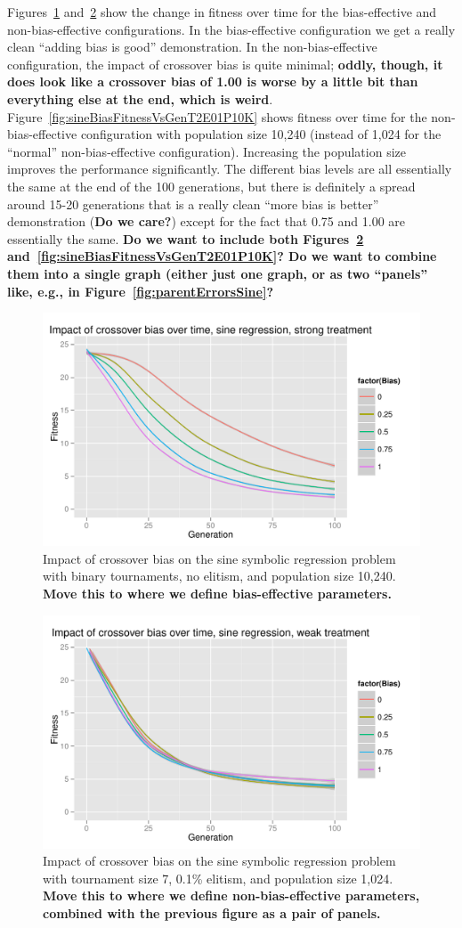 \documentclass{sig-alternate}
\begin{document}
Figures~\ref{fig:sineBiasFitnessVsGenStrong} and~\ref{fig:sineBiasFitnessVsGenWeak} show the change in fitness over
time for the bias-effective and non-bias-effective configurations. In the bias-effective configuration we get a really
clean ``adding bias is good'' demonstration. In the non-bias-effective configuration, the impact of crossover bias is
quite minimal; \textbf{oddly, though, it does look like a crossover bias of 1.00 is worse by a little bit than
everything else at the end, which is weird}. Figure~\ref{fig:sineBiasFitnessVsGenT2E01P10K} shows fitness over time for
the non-bias-effective configuration with population size 10,240 (instead of 1,024 for the ``normal'' non-bias-effective
configuration). Increasing the population size improves the performance significantly. The different bias levels are
all essentially the same at the end of the 100 generations, but there is definitely a spread around 15-20 generations
that is a really clean ``more bias is better'' demonstration (\textbf{Do we care?}) except for the fact that 0.75 and
1.00 are essentially the same. \textbf{Do we want to include both Figures~\ref{fig:sineBiasFitnessVsGenWeak}
and~\ref{fig:sineBiasFitnessVsGenT2E01P10K}? Do we want to combine them into a single graph (either just one graph, or
as two ``panels'' like, e.g., in Figure~\ref{fig:parentErrorsSine}?}

\begin{figure}
\centering
\includegraphics[width=0.45 \textwidth]{Plots/Sine_XO_fitness_vs_gen_strong.pdf}
\caption{Impact of crossover bias on the sine symbolic regression problem with binary tournaments, no elitism, and 
population size 10,240. \textbf{Move this to where we define bias-effective parameters.}}
\label{fig:sineBiasFitnessVsGenStrong}
\end{figure}

\begin{figure}
\centering
\includegraphics[width=0.45 \textwidth]{Plots/Sine_XO_fitness_vs_gen_weak.pdf}
\caption{Impact of crossover bias on the sine symbolic regression problem with tournament size 7, 0.1\% elitism, and 
population size 1,024.  \textbf{Move this to where we define non-bias-effective parameters, combined with the previous figure as a pair of panels.}}
\label{fig:sineBiasFitnessVsGenWeak}
\end{figure}
\end{document}

